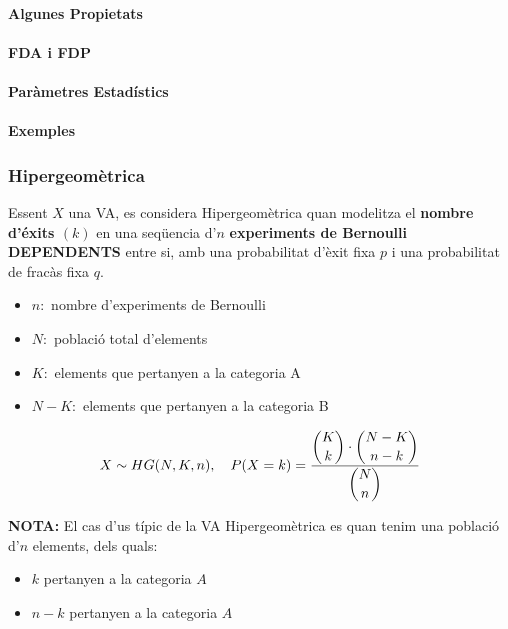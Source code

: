 \documentclass{article}
\begin{document}
\paragraph{Algunes Propietats}

\paragraph{FDA i FDP}

\paragraph{Paràmetres Estadístics}

\paragraph{Exemples}

\subsubsection{Hipergeomètrica} \label{hipergeom}
Essent $X$ una VA, es considera Hipergeomètrica quan modelitza el \textbf{nombre d'éxits $(k)$} en una seqüencia d'$n$ \textbf{experiments de Bernoulli DEPENDENTS} entre si, amb una probabilitat d'èxit fixa $p$ i una probabilitat de fracàs fixa $q$. 

\begin{itemize}
    \item $n:$ nombre d'experiments de Bernoulli
    \item $N:$ població total d'elements
    \item $K:$ elements que pertanyen a la categoria A
    \item $N-K:$ elements que pertanyen a la categoria B
\end{itemize}
\begin{align*}
    X \sim HG(N,K,n), \quad P(X=k) = \dfrac{\dbinom{K}{k} \cdot \dbinom{N-K}{n-k}}{\dbinom{N}{n}}
\end{align*}

\textbf{NOTA:} El cas d'us típic de la VA Hipergeomètrica es quan tenim una població d'$n$ elements, dels quals:

\begin{itemize}
    \item $k$ pertanyen a la categoria $A$
    \item $n-k$ pertanyen a la categoria $A$
\end{itemize}
\end{document}

